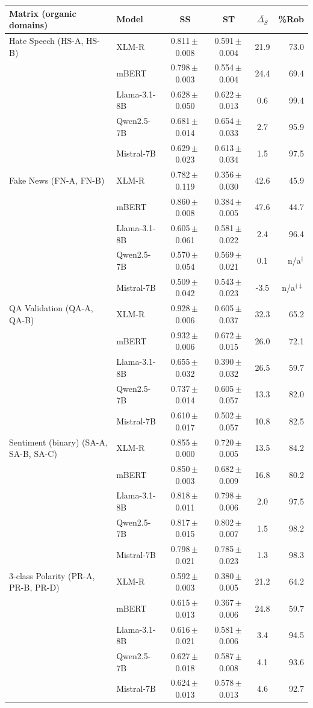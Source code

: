 \begin{tabular}{llcccr}
\toprule
Matrix (organic domains) & Model & SS & ST & $\overline{\Delta_S}$ & \%Rob \\
\midrule
Hate Speech (HS-A, HS-B) & XLM-R & 0.811\,$\pm$\,0.008 & 0.591\,$\pm$\,0.004 & 21.9 & 73.0 \\
 & mBERT & 0.798\,$\pm$\,0.003 & 0.554\,$\pm$\,0.004 & 24.4 & 69.4 \\
 & Llama-3.1-8B & 0.628\,$\pm$\,0.050 & 0.622\,$\pm$\,0.013 & 0.6 & 99.4 \\
 & Qwen2.5-7B & 0.681\,$\pm$\,0.014 & 0.654\,$\pm$\,0.033 & 2.7 & 95.9 \\
 & Mistral-7B & 0.629\,$\pm$\,0.023 & 0.613\,$\pm$\,0.034 & 1.5 & 97.5 \\
\midrule
Fake News (FN-A, FN-B) & XLM-R & 0.782\,$\pm$\,0.119 & 0.356\,$\pm$\,0.030 & 42.6 & 45.9 \\
 & mBERT & 0.860\,$\pm$\,0.008 & 0.384\,$\pm$\,0.005 & 47.6 & 44.7 \\
 & Llama-3.1-8B & 0.605\,$\pm$\,0.061 & 0.581\,$\pm$\,0.022 & 2.4 & 96.4 \\
 & Qwen2.5-7B & 0.570\,$\pm$\,0.054 & 0.569\,$\pm$\,0.021 & 0.1 & n/a$^\dagger$ \\
 & Mistral-7B & 0.509\,$\pm$\,0.042 & 0.543\,$\pm$\,0.023 & -3.5 & n/a$^{\dagger\ddagger}$ \\
\midrule
QA Validation (QA-A, QA-B) & XLM-R & 0.928\,$\pm$\,0.006 & 0.605\,$\pm$\,0.037 & 32.3 & 65.2 \\
 & mBERT & 0.932\,$\pm$\,0.006 & 0.672\,$\pm$\,0.015 & 26.0 & 72.1 \\
 & Llama-3.1-8B & 0.655\,$\pm$\,0.032 & 0.390\,$\pm$\,0.032 & 26.5 & 59.7 \\
 & Qwen2.5-7B & 0.737\,$\pm$\,0.014 & 0.605\,$\pm$\,0.057 & 13.3 & 82.0 \\
 & Mistral-7B & 0.610\,$\pm$\,0.017 & 0.502\,$\pm$\,0.057 & 10.8 & 82.5 \\
\midrule
Sentiment (binary) (SA-A, SA-B, SA-C) & XLM-R & 0.855\,$\pm$\,0.000 & 0.720\,$\pm$\,0.005 & 13.5 & 84.2 \\
 & mBERT & 0.850\,$\pm$\,0.003 & 0.682\,$\pm$\,0.009 & 16.8 & 80.2 \\
 & Llama-3.1-8B & 0.818\,$\pm$\,0.011 & 0.798\,$\pm$\,0.006 & 2.0 & 97.5 \\
 & Qwen2.5-7B & 0.817\,$\pm$\,0.015 & 0.802\,$\pm$\,0.007 & 1.5 & 98.2 \\
 & Mistral-7B & 0.798\,$\pm$\,0.021 & 0.785\,$\pm$\,0.023 & 1.3 & 98.3 \\
\midrule
3-class Polarity (PR-A, PR-B, PR-D) & XLM-R & 0.592\,$\pm$\,0.003 & 0.380\,$\pm$\,0.005 & 21.2 & 64.2 \\
 & mBERT & 0.615\,$\pm$\,0.013 & 0.367\,$\pm$\,0.006 & 24.8 & 59.7 \\
 & Llama-3.1-8B & 0.616\,$\pm$\,0.021 & 0.581\,$\pm$\,0.006 & 3.4 & 94.5 \\
 & Qwen2.5-7B & 0.627\,$\pm$\,0.018 & 0.587\,$\pm$\,0.008 & 4.1 & 93.6 \\
 & Mistral-7B & 0.624\,$\pm$\,0.013 & 0.578\,$\pm$\,0.013 & 4.6 & 92.7 \\
\bottomrule
\end{tabular}
